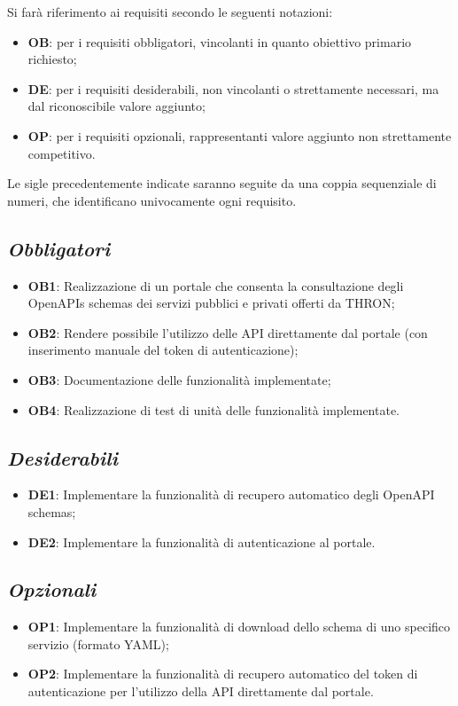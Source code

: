 Si farà riferimento ai requisiti secondo le seguenti notazioni:
\begin{itemize}
    \item \textbf{OB}: per i requisiti obbligatori, vincolanti in quanto obiettivo primario richiesto;
    \item \textbf{DE}: per i requisiti desiderabili, non vincolanti o strettamente necessari, ma dal riconoscibile valore aggiunto;
    \item \textbf{OP}: per i requisiti opzionali, rappresentanti valore aggiunto non strettamente competitivo.
\end{itemize}
Le sigle precedentemente indicate saranno seguite da una coppia sequenziale di numeri, che identificano univocamente ogni requisito.

\subsection*{\emph{Obbligatori}}
\begin{itemize}
    \item \textbf{OB1}: Realizzazione di un portale che consenta la consultazione degli OpenAPIs schemas dei servizi pubblici e privati offerti da THRON;
    \item \textbf{OB2}: Rendere possibile l'utilizzo delle API direttamente dal portale (con inserimento manuale del token di autenticazione);
    \item \textbf{OB3}: Documentazione delle funzionalità implementate;
    \item \textbf{OB4}: Realizzazione di test di unità delle funzionalità implementate.
\end{itemize}

\subsection*{\emph{Desiderabili}}
\begin{itemize}
    \item \textbf{DE1}:  Implementare la funzionalità di recupero automatico degli OpenAPI schemas;
    \item \textbf{DE2}: Implementare la funzionalità di autenticazione al portale.
\end{itemize}

\subsection*{\emph{Opzionali}}
\begin{itemize}
    \item \textbf{OP1}: Implementare la funzionalità di download dello schema di uno specifico servizio (formato YAML);
    \item \textbf{OP2}: Implementare la funzionalità di recupero automatico del token di autenticazione per l'utilizzo della API direttamente dal portale.
\end{itemize}

